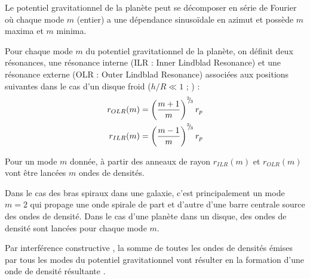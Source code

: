 

Le potentiel gravitationnel de la planète peut se décomposer en série de Fourier où chaque mode $m$ (entier) a une dépendance sinusoïdale en azimut et possède $m$ maxima et $m$ minima. 

Pour chaque mode $m$ du potentiel gravitationnel de la planète, on définit deux résonances, une résonance interne (ILR : Inner Lindblad Resonance) et une résonance externe (OLR : Outer Lindblad Resonance) associées aux positions suivantes dans le cas d'un disque froid ($h/R\ll 1$ ; \cite{ward1997protoplanet}) : 
\begin{subequations}
\begin{align}
r_{OLR}(m) &= \left(\frac{m+1}{m}\right)^{{}^{2\!\!}/ _{\!3}}r_p\\
r_{ILR}(m) &= \left(\frac{m-1}{m}\right)^{{}^{2\!\!}/ _{\!3}}r_p
\end{align}
\end{subequations}

Pour un mode $m$ donnée, à partir des anneaux de rayon $r_{ILR}(m)$ et $r_{OLR}(m)$ vont être lancées $m$ ondes de densités. 

Dans le cas des bras spiraux dans une galaxie, c'est principalement un mode $m=2$ qui propage une onde spirale de part et d'autre d'une barre centrale source des ondes de densité. Dans le cas d'une planète dans un disque, des ondes de densité sont lancées pour chaque mode $m$. 

Par interférence constructive \citep{ogilvie2002wake}, la somme de toutes les ondes de densités émises par tous les modes du potentiel gravitationnel vont résulter en la formation d'une onde de densité résultante . 

